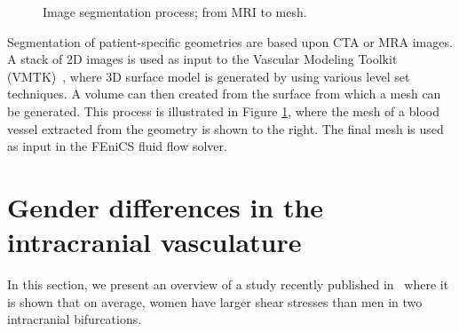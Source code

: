 \begin{figure} \label{fig:imagseg}
  \begin{center}
    \caption{Image segmentation process; from MRI to mesh.}
  \end{center}
\end{figure}

Segmentation of patient-specific geometries are based upon CTA or MRA
images. A stack of 2D images is used as input to the Vascular Modeling
Toolkit (VMTK)~\cite{vmtk}, where 3D surface model is generated by using
various level set techniques. A volume can then created from the surface from
which a mesh can be generated. This process is illustrated in Figure
\ref{fig:imagseg}, where the mesh of a blood vessel extracted from the
geometry is shown to the right. The final mesh is used as input in the
FEniCS fluid flow solver.

\section{Gender differences in the intracranial vasculature} \label{gender}

In this section, we present an overview of a study recently published
in~\cite{kvs-sex} where it is shown that on average, women have larger
shear stresses than men in two intracranial bifurcations.

